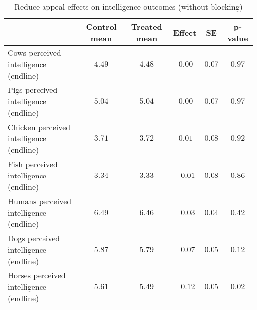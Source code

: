 \begin{table*}[ht]
\caption{Reduce appeal effects on intelligence outcomes (without blocking)\label{round}} 
\begin{center}
\begin{tabular}{lccccc}
\hline\hline
\multicolumn{1}{l}{}&\multicolumn{1}{c}{Control mean}&\multicolumn{1}{c}{Treated mean}&\multicolumn{1}{c}{Effect}&\multicolumn{1}{c}{SE}&\multicolumn{1}{c}{p-value}\tabularnewline
\hline
Cows perceived intelligence (endline)&$4.49$&$4.48$&$~0.00$&$0.07$&$0.97$\tabularnewline
Pigs perceived intelligence (endline)&$5.04$&$5.04$&$~0.00$&$0.07$&$0.97$\tabularnewline
Chicken perceived intelligence (endline)&$3.71$&$3.72$&$~0.01$&$0.08$&$0.92$\tabularnewline
Fish perceived intelligence (endline)&$3.34$&$3.33$&$-0.01$&$0.08$&$0.86$\tabularnewline
Humans perceived intelligence (endline)&$6.49$&$6.46$&$-0.03$&$0.04$&$0.42$\tabularnewline
Dogs perceived intelligence (endline)&$5.87$&$5.79$&$-0.07$&$0.05$&$0.12$\tabularnewline
Horses perceived intelligence (endline)&$5.61$&$5.49$&$-0.12$&$0.05$&$0.02$\tabularnewline
\hline
\end{tabular}\end{center}

\end{table*}
